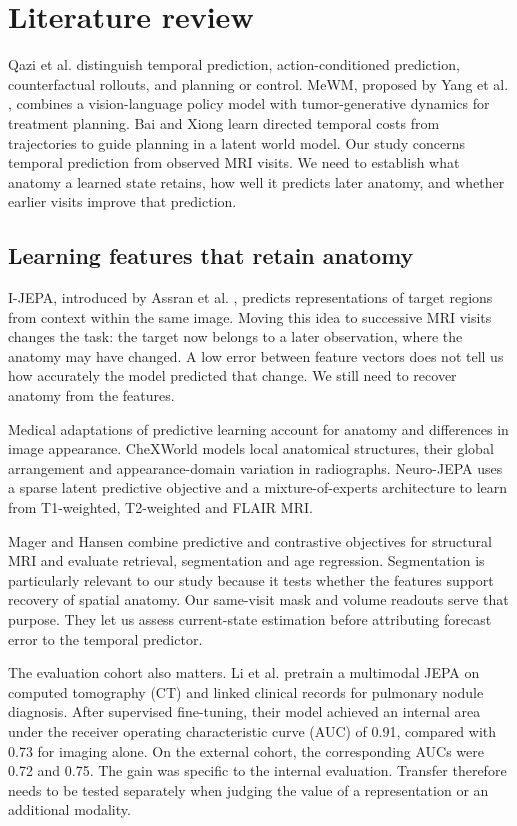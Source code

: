 \clearpage
\chapter{Literature review}

Qazi et al. \cite{ref2} distinguish temporal prediction, action-conditioned prediction, counterfactual rollouts, and planning or control. MeWM, proposed by Yang et al. \cite{ref5}, combines a vision-language policy model with tumor-generative dynamics for treatment planning. Bai and Xiong \cite{ref14} learn directed temporal costs from trajectories to guide planning in a latent world model. Our study concerns temporal prediction from observed MRI visits. We need to establish what anatomy a learned state retains, how well it predicts later anatomy, and whether earlier visits improve that prediction.

\section{Learning features that retain anatomy}

I-JEPA, introduced by Assran et al. \cite{ref3}, predicts representations of target regions from context within the same image. Moving this idea to successive MRI visits changes the task: the target now belongs to a later observation, where the anatomy may have changed. A low error between feature vectors does not tell us how accurately the model predicted that change. We still need to recover anatomy from the features.

Medical adaptations of predictive learning account for anatomy and differences in image appearance. CheXWorld \cite{ref10} models local anatomical structures, their global arrangement and appearance-domain variation in radiographs. Neuro-JEPA \cite{ref11} uses a sparse latent predictive objective and a mixture-of-experts architecture to learn from T1-weighted, T2-weighted and FLAIR MRI.

Mager and Hansen \cite{ref12} combine predictive and contrastive objectives for structural MRI and evaluate retrieval, segmentation and age regression. Segmentation is particularly relevant to our study because it tests whether the features support recovery of spatial anatomy. Our same-visit mask and volume readouts serve that purpose. They let us assess current-state estimation before attributing forecast error to the temporal predictor.

\begin{samepage}
The evaluation cohort also matters. Li et al. \cite{ref13} pretrain a multimodal JEPA on computed tomography (CT) and linked clinical records for pulmonary nodule diagnosis. After supervised fine-tuning, their model achieved an internal area under the receiver operating characteristic curve (AUC) of 0.91, compared with 0.73 for imaging alone. On the external cohort, the corresponding AUCs were 0.72 and 0.75. The gain was specific to the internal evaluation. Transfer therefore needs to be tested separately when judging the value of a representation or an additional modality.

\end{samepage}

